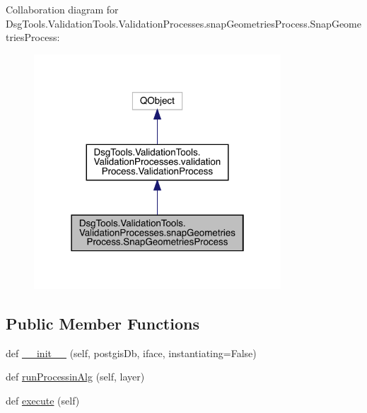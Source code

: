 Collaboration diagram for Dsg\+Tools.\+Validation\+Tools.\+Validation\+Processes.\+snap\+Geometries\+Process.\+Snap\+Geometries\+Process\+:
\nopagebreak
\begin{figure}[H]
\begin{center}
\leavevmode
\includegraphics[width=262pt]{class_dsg_tools_1_1_validation_tools_1_1_validation_processes_1_1snap_geometries_process_1_1_sna9f8e5045b3adc794d81c4cce0dd4b381}
\end{center}
\end{figure}
\subsection*{Public Member Functions}
\begin{DoxyCompactItemize}
\item 
def \mbox{\hyperlink{class_dsg_tools_1_1_validation_tools_1_1_validation_processes_1_1snap_geometries_process_1_1_snap_geometries_process_a709f3c8ee6296562d5acfc68f206a89c}{\+\_\+\+\_\+init\+\_\+\+\_\+}} (self, postgis\+Db, iface, instantiating=False)
\item 
def \mbox{\hyperlink{class_dsg_tools_1_1_validation_tools_1_1_validation_processes_1_1snap_geometries_process_1_1_snap_geometries_process_a540ebe68bd43383327a482fcf8829354}{run\+Processin\+Alg}} (self, layer)
\item 
def \mbox{\hyperlink{class_dsg_tools_1_1_validation_tools_1_1_validation_processes_1_1snap_geometries_process_1_1_snap_geometries_process_a2f96feffb03eb9ef161e4d8d5f8d7761}{execute}} (self)
\end{DoxyCompactItemize}
